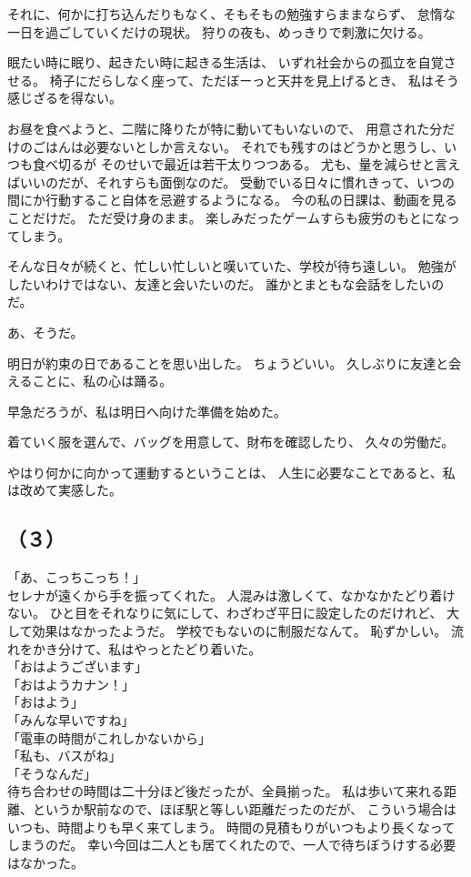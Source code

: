 \documentclass[../IHMain]{subfiles}
\begin{document}
それに、何かに打ち込んだりもなく、そもそもの勉強すらままならず、
怠惰な一日を過ごしていくだけの現状。
狩りの夜も、めっきりで刺激に欠ける。

眠たい時に眠り、起きたい時に起きる生活は、
いずれ社会からの孤立を自覚させる。
椅子にだらしなく座って、ただぼーっと天井を見上げるとき、
私はそう感じざるを得ない。

お昼を食べようと、二階に降りたが特に動いてもいないので、
用意された分だけのごはんは必要ないとしか言えない。
それでも残すのはどうかと思うし、いつも食べ切るが
そのせいで最近は若干太りつつある。
尤も、量を減らせと言えばいいのだが、それすらも面倒なのだ。
受動でいる日々に慣れきって、いつの間にか行動すること自体を忌避するようになる。
今の私の日課は、動画を見ることだけだ。
ただ受け身のまま。
楽しみだったゲームすらも疲労のもとになってしまう。

そんな日々が続くと、忙しい忙しいと嘆いていた、学校が待ち遠しい。
勉強がしたいわけではない、友達と会いたいのだ。
誰かとまともな会話をしたいのだ。

あ、そうだ。

明日が約束の日であることを思い出した。
ちょうどいい。
久しぶりに友達と会えることに、私の心は踊る。

早急だろうが、私は明日へ向けた準備を始めた。

着ていく服を選んで、バッグを用意して、財布を確認したり、
久々の労働だ。

やはり何かに向かって運動するということは、
人生に必要なことであると、私は改めて実感した。

\subsection*{（３）}
「あ、こっちこっち！」\\
セレナが遠くから手を振ってくれた。
人混みは激しくて、なかなかたどり着けない。
ひと目をそれなりに気にして、わざわざ平日に設定したのだけれど、
大して効果はなかったようだ。
学校でもないのに制服だなんて。
恥ずかしい。
流れをかき分けて、私はやっとたどり着いた。\\
「おはようございます」\\
「おはようカナン！」\\
「おはよう」\\
「みんな早いですね」\\
「電車の時間がこれしかないから」\\
「私も、バスがね」\\
「そうなんだ」\\
待ち合わせの時間は二十分ほど後だったが、全員揃った。
私は歩いて来れる距離、というか駅前なので、ほぼ駅と等しい距離だったのだが、
こういう場合はいつも、時間よりも早く来てしまう。
時間の見積もりがいつもより長くなってしまうのだ。
幸い今回は二人とも居てくれたので、一人で待ちぼうけする必要はなかった。
\end{document}
